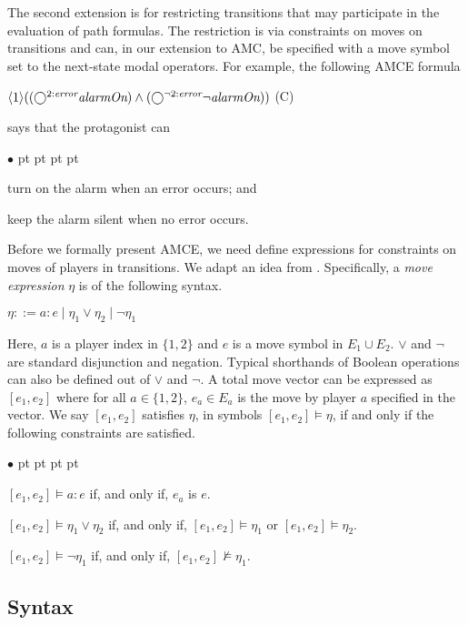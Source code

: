\documentclass[times,10pt,twocolumn]{article}
\newcommand{\true}{\mbox{\em true}}
\newcommand{\emserr}{\textit{\scriptsize error}}
\newcommand{\nxt}{\bigcirc}
\newenvironment{list1}{\begin{list}{$\bullet$}
{\topsep 0 pt \parsep 0 pt \partopsep 0 pt \itemsep 0
pt}}{\end{list}}
\begin{document}
The second extension is for restricting transitions that may participate 
in the evaluation of path formulas.  
The restriction is via constraints on moves on transitions and 
can, in our extension to AMC, be specified with a  
move symbol set to the next-state modal operators.  
For example, the following AMCE formula  
\begin{center} 
\hfill $\langle 1\rangle ((\nxt^{2:\emserr}\mbox{\em alarmOn}) 
\wedge (\nxt^{\neg 2:\emserr}\neg\mbox{\em alarmOn}))$ 
\hfill (C) 
\end{center} 
says that the protagonist can 
\begin{list1}
\item turn on the alarm when an error occurs; and 
\item keep the alarm silent when no error occurs.
\end{list1} 
Before we formally present AMCE, we need define expressions for 
constraints on moves of players in transitions.  
We adapt an idea from \cite{Wang14}.  
Specifically, a {\em move expression} $\eta$ is of the following syntax. 
\begin{center} 
$\eta ::= a:e \mid \eta_1\vee\eta_2 \mid \neg \eta_1$
\end{center} 
Here, $a$ is a player index in $\{1,2\}$ and $e$ is a move symbol in $E_1\cup E_2$.  
$\vee$ and $\neg$ are standard disjunction and negation.  
Typical shorthands of Boolean operations can also be defined out of 
$\vee$ and $\neg$.  
A total move vector can be expressed as $[e_1,e_2]$ 
where for all $a\in\{1,2\}$, $e_a\in E_a$ is the move by 
player $a$ specified in the vector.  
We say $[e_1,e_2]$ satisfies $\eta$, in symbols 
$[e_1,e_2]\models \eta$, if and only if the 
following constraints are satisfied. 
\begin{list1} 
\item $[e_1,e_2]\models a:e$ if, and only if, $e_a$ is $e$.  
\item $[e_1,e_2]\models \eta_1\vee\eta_2$ 
  if, and only if, $[e_1,e_2]\models \eta_1$ or 
  $[e_1,e_2]\models \eta_2$. 
\item $[e_1,e_2]\models \neg\eta_1$ 
  if, and only if, $[e_1,e_2]\not\models \eta_1$.   
\end{list1} 



\subsection{Syntax\label{subsec.syntax}}
\end{document}
